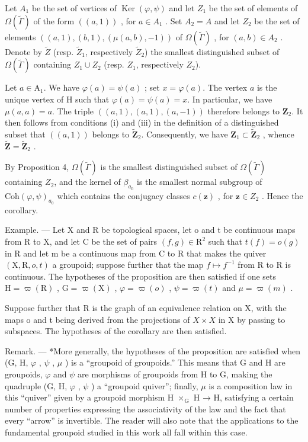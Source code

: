 Let \(A_{1}\) be the set of vertices of \(\operatorname{Ker}(\varphi,\psi)\) and let \(Z_{1}\) be the set of elements of \(\Omega(\widetilde{\Gamma})\) of the form \(((a,1))\) , for \(a\in A_{1}\) . Set \(A_{2}=A\) and let \(Z_{2}\) be the set of elements \(((a,1),(b,1),(\mu(a,b),-1))\) of \(\Omega(\widetilde{\Gamma})\) , for \((a,b)\in A_{2}\) . Denote by \(\widetilde{Z}\) (resp. \(\widetilde{Z}_{1}\), respectively \(\widetilde{Z}_{2}\)) the smallest distinguished subset of \(\Omega(\widetilde{\Gamma})\) containing \(Z_{1}\cup Z_{2}\) (resp. \(Z_{1}\), respectively \(Z_{2}\)).

Let \(a \in \mathrm{A}_1\). We have \(\varphi(a) = \psi(a)\) ; set \(x = \varphi(a)\). The vertex \(a\) is the unique vertex of H such that \(\varphi(a) = \psi(a) = x\). In particular, we have \(\mu(a, a) = a\). The triple \(((a, 1), (a, 1), (a, -1))\) therefore belongs to \(\mathbf{Z}_2\). It then follows from conditions (i) and (iii) in the definition of a distinguished subset that \(((a, 1))\) belongs to \(\widetilde{\mathbf{Z}}_2\). Consequently, we have \(\mathbf{Z}_1 \subset \widetilde{\mathbf{Z}}_2\) , whence \(\widetilde{\mathbf{Z}} = \widetilde{\mathbf{Z}}_2\) .

By Proposition 4, \(\Omega(\tilde{\Gamma})\) is the smallest distinguished subset of \(\Omega(\tilde{\Gamma})\) containing \(Z_{2}\), and the kernel of \(\beta_{a_{0}}\) is the smallest normal subgroup of \(\mathrm{Coh}(\varphi,\psi)_{a_{0}}\) which contains the conjugacy classes \(c(\mathbf{z})\) , for \(\mathbf{z}\in Z_{2}\) . Hence the corollary.

Example. --- Let X and R be topological spaces, let o and t be continuous maps from R to X, and let C be the set of pairs \((f,g)\in\mathrm{R}^{2}\) such that \(t(f)=o(g)\) in R and let m be a continuous map from C to R that makes the quiver \((\mathrm{X},\mathrm{R},o,t)\) a groupoid; suppose further that the map \(f\mapsto f^{-1}\) from R to R is continuous. The hypotheses of the proposition are then satisfied if one sets \(\mathrm{H}=\varpi(\mathrm{R})\) , \(\mathrm{G}=\varpi(\mathrm{X})\) , \(\varphi=\varpi(o)\) , \(\psi=\varpi(t)\) and \(\mu=\varpi(m)\) .

Suppose further that R is the graph of an equivalence relation on X, with the maps o and t being derived from the projections of \(X \times X\) in X by passing to subspaces. The hypotheses of the corollary are then satisfied.

Remark. --- *More generally, the hypotheses of the proposition are satisfied when (G, H, \(\varphi\) , \(\psi\) , \(\mu\) ) is a “groupoid of groupoids.” This means that G and H are groupoids, \(\varphi\) and \(\psi\) are morphisms of groupoids from H to G, making the quadruple (G, H, \(\varphi\) , \(\psi\) ) a “groupoid quiver”; finally, \(\mu\) is a composition law in this “quiver” given by a groupoid morphism H \(\times_{\mathrm{G}}\) H → H, satisfying a certain number of properties expressing the associativity of the law and the fact that every “arrow” is invertible. The reader will also note that the applications to the fundamental groupoid studied in this work all fall within this case.

